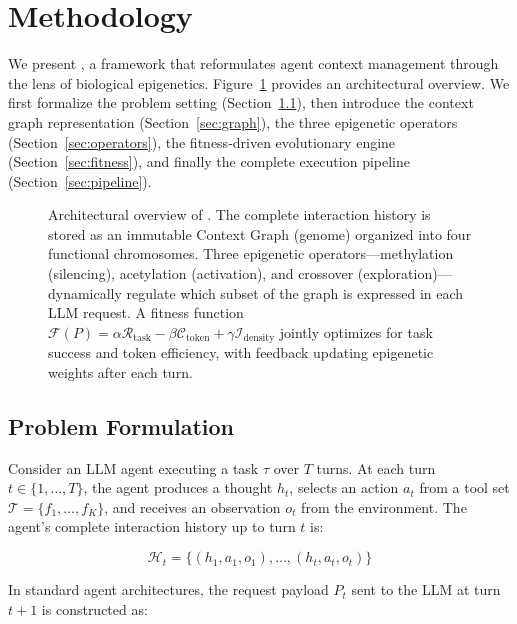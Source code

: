 \section{Methodology}

We present \EpiContext, a framework that reformulates agent context management through the lens of biological epigenetics. Figure~\ref{fig:architecture} provides an architectural overview. We first formalize the problem setting (Section~\ref{sec:problem}), then introduce the context graph representation (Section~\ref{sec:graph}), the three epigenetic operators (Section~\ref{sec:operators}), the fitness-driven evolutionary engine (Section~\ref{sec:fitness}), and finally the complete execution pipeline (Section~\ref{sec:pipeline}).

\begin{figure}[t]
\centering

\caption{Architectural overview of \EpiContext. The complete interaction history is stored as an immutable Context Graph (genome) organized into four functional chromosomes. Three epigenetic operators---methylation (silencing), acetylation (activation), and crossover (exploration)---dynamically regulate which subset of the graph is expressed in each LLM request. A fitness function $\mathcal{F}(P) = \alpha\mathcal{R}_{\text{task}} - \beta\mathcal{C}_{\text{token}} + \gamma\mathcal{I}_{\text{density}}$ jointly optimizes for task success and token efficiency, with feedback updating epigenetic weights after each turn.}
\label{fig:architecture}
\end{figure}

\subsection{Problem Formulation}
\label{sec:problem}

Consider an LLM agent executing a task $\tau$ over $T$ turns. At each turn $t \in \{1, \ldots, T\}$, the agent produces a thought $h_t$, selects an action $a_t$ from a tool set $\mathcal{T} = \{f_1, \ldots, f_K\}$, and receives an observation $o_t$ from the environment. The agent's complete interaction history up to turn $t$ is:

\begin{equation}
    \mathcal{H}_t = \{(h_1, a_1, o_1), \ldots, (h_t, a_t, o_t)\}
\end{equation}

In standard agent architectures, the request payload $P_t$ sent to the LLM at turn $t+1$ is constructed as:

